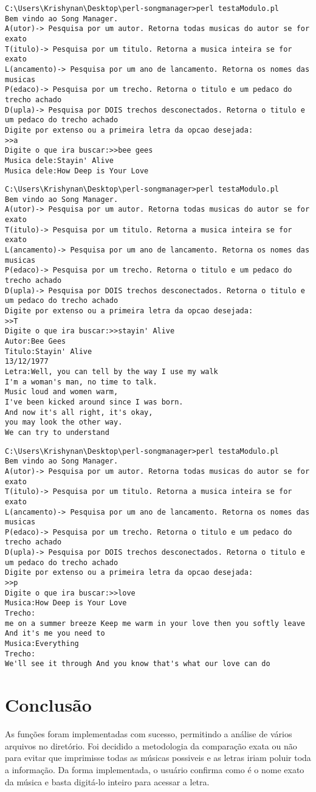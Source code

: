 \documentclass[12pt]{article}
\begin{document}
\begin{lstlisting}[language={}]
C:\Users\Krishynan\Desktop\perl-songmanager>perl testaModulo.pl
Bem vindo ao Song Manager.
A(utor)-> Pesquisa por um autor. Retorna todas musicas do autor se for exato
T(itulo)-> Pesquisa por um titulo. Retorna a musica inteira se for exato
L(ancamento)-> Pesquisa por um ano de lancamento. Retorna os nomes das musicas
P(edaco)-> Pesquisa por um trecho. Retorna o titulo e um pedaco do trecho achado
D(upla)-> Pesquisa por DOIS trechos desconectados. Retorna o titulo e um pedaco do trecho achado
Digite por extenso ou a primeira letra da opcao desejada:
>>a
Digite o que ira buscar:>>bee gees
Musica dele:Stayin' Alive
Musica dele:How Deep is Your Love
\end{lstlisting}
\begin{lstlisting}[language={}]
C:\Users\Krishynan\Desktop\perl-songmanager>perl testaModulo.pl
Bem vindo ao Song Manager.
A(utor)-> Pesquisa por um autor. Retorna todas musicas do autor se for exato
T(itulo)-> Pesquisa por um titulo. Retorna a musica inteira se for exato
L(ancamento)-> Pesquisa por um ano de lancamento. Retorna os nomes das musicas
P(edaco)-> Pesquisa por um trecho. Retorna o titulo e um pedaco do trecho achado
D(upla)-> Pesquisa por DOIS trechos desconectados. Retorna o titulo e um pedaco do trecho achado
Digite por extenso ou a primeira letra da opcao desejada:
>>T
Digite o que ira buscar:>>stayin' Alive
Autor:Bee Gees
Titulo:Stayin' Alive
13/12/1977
Letra:Well, you can tell by the way I use my walk
I'm a woman's man, no time to talk.
Music loud and women warm,
I've been kicked around since I was born.
And now it's all right, it's okay,
you may look the other way.
We can try to understand
\end{lstlisting}
\begin{lstlisting}[language={}]
C:\Users\Krishynan\Desktop\perl-songmanager>perl testaModulo.pl
Bem vindo ao Song Manager.
A(utor)-> Pesquisa por um autor. Retorna todas musicas do autor se for exato
T(itulo)-> Pesquisa por um titulo. Retorna a musica inteira se for exato
L(ancamento)-> Pesquisa por um ano de lancamento. Retorna os nomes das musicas
P(edaco)-> Pesquisa por um trecho. Retorna o titulo e um pedaco do trecho achado
D(upla)-> Pesquisa por DOIS trechos desconectados. Retorna o titulo e um pedaco do trecho achado
Digite por extenso ou a primeira letra da opcao desejada:
>>p
Digite o que ira buscar:>>love
Musica:How Deep is Your Love
Trecho:
me on a summer breeze Keep me warm in your love then you softly leave And it's me you need to
Musica:Everything
Trecho:
We'll see it through And you know that's what our love can do
\end{lstlisting}
\section{Conclusão}
As funções foram implementadas com sucesso, permitindo a análise de vários arquivos no diretório. Foi decidido a metodologia da comparação exata ou não para evitar que imprimisse todas as músicas possiveis e as letras iriam poluir toda a informação. Da forma implementada, o usuário confirma como é o nome exato da música e basta digitá-lo inteiro para acessar a letra.
\end{document}
